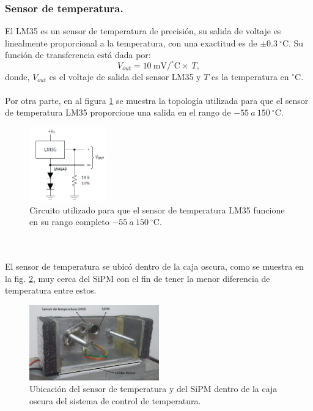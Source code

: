 \subsubsection{Sensor de temperatura.}
El LM35 es un sensor de temperatura de precisión, su salida de voltaje es linealmente proporcional a la temperatura, con una exactitud es de $ \pm 0.3 ~^\circ \mbox{C}$. Su función de transferencia está dada por:
\begin{equation}
    V_{out}=10~\mbox{mV}/^\circ \mbox{C} \times~T,
    \label{SensorTf}
\end{equation}
donde, $V_{out}$ es el voltaje de salida del sensor LM35 y $T$ es la temperatura en $^\circ \mbox{C}$.\\ \\
Por otra parte, en al figura \ref{fig:TempSense} se muestra la topología utilizada para que el sensor de temperatura LM35 proporcione una salida en el rango de $-55~a ~150~ ^\circ$C. 
\begin{figure}[h!]
\begin{centering}
  \includegraphics[width=0.3\textwidth]{Images/TempSensor.png}
    \caption{Circuito utilizado para que el sensor de temperatura LM35 funcione en su rango completo $-55~a ~150~ ^\circ \mbox{C}$.}
    \label{fig:TempSense}
  \par\end{centering}
\end{figure}
\\ \\
El sensor de temperatura se ubicó dentro de la caja oscura, como se muestra en la fig. \ref{fig:insideBox}, muy cerca del SiPM con el fin de tener la menor diferencia de temperatura entre estos.
\begin{figure}[h!]
\begin{centering}
  \includegraphics[width=0.5\textwidth]{Images/InsideBox.png}
    \caption{Ubicación del sensor de temperatura y del SiPM dentro de la caja oscura del sistema de control de temperatura.}
    \label{fig:insideBox}
  \par\end{centering}
\end{figure}
